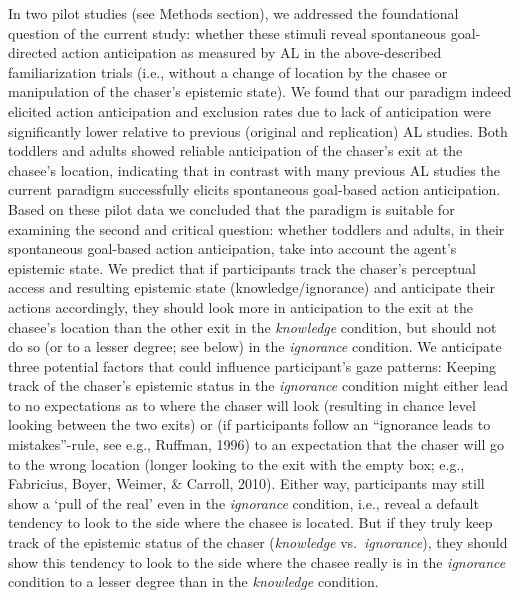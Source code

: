 \documentclass[
  english,
  man,floatsintext]{apa6}
\begin{document}
In two pilot studies (see Methods section), we addressed the foundational question of the current study: whether these stimuli reveal spontaneous goal-directed action anticipation as measured by AL in the above-described familiarization trials (i.e., without a change of location by the chasee or manipulation of the chaser's epistemic state). We found that our paradigm indeed elicited action anticipation and exclusion rates due to lack of anticipation were significantly lower relative to previous (original and replication) AL studies. Both toddlers and adults showed reliable anticipation of the chaser's exit at the chasee's location, indicating that in contrast with many previous AL studies the current paradigm successfully elicits spontaneous goal-based action anticipation. Based on these pilot data we concluded that the paradigm is suitable for examining the second and critical question: whether toddlers and adults, in their spontaneous goal-based action anticipation, take into account the agent's epistemic state.
We predict that if participants track the chaser's perceptual access and resulting epistemic state (knowledge/ignorance) and anticipate their actions accordingly, they should look more in anticipation to the exit at the chasee's location than the other exit in the \emph{knowledge} condition, but should not do so (or to a lesser degree; see below) in the \emph{ignorance} condition. We anticipate three potential factors that could influence participant's gaze patterns: Keeping track of the chaser's epistemic status in the \emph{ignorance} condition might either lead to no expectations as to where the chaser will look (resulting in chance level looking between the two exits) or (if participants follow an {``ignorance leads to mistakes''}-rule, see e.g., Ruffman, 1996) to an expectation that the chaser will go to the wrong location (longer looking to the exit with the empty box; e.g., Fabricius, Boyer, Weimer, \& Carroll, 2010). Either way, participants may still show a `pull of the real' even in the \emph{ignorance} condition, i.e., reveal a default tendency to look to the side where the chasee is located. But if they truly keep track of the epistemic status of the chaser (\emph{knowledge} vs.~\emph{ignorance}), they should show this tendency to look to the side where the chasee really is in the \emph{ignorance} condition to a lesser degree than in the \emph{knowledge} condition.
\end{document}
